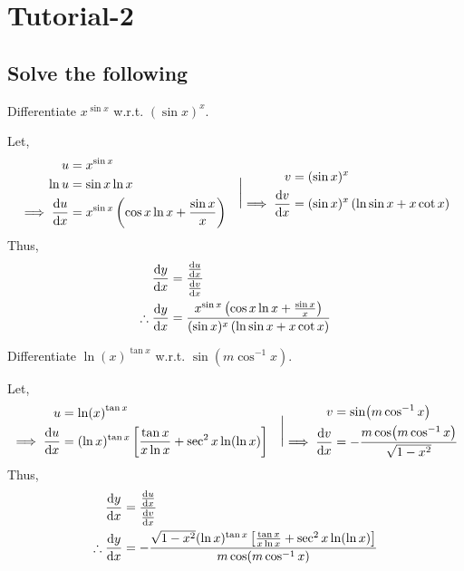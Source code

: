 \section{Tutorial-2}
\subsection{Solve the following}
\begin{asign}
	Differentiate $x^{\sin x}$ w.r.t. $(\sin x)^x$.
\end{asign}
\begin{anse}
	Let,
	\[\begin{split}
		u&=x^{\sin x}\\
		\ln u&=\sin x \ln x\\
		\implies \dv{u}{x}&=x^{\sin x}\left(\cos x\ln x+\frac{\sin x}{x}\right)
	\end{split}
	\quad \bigg\vert
	\begin{split}
		v&=(\sin x)^x\\
		\implies \dv{v}{x}&=(\sin x)^x\left(\ln\sin x+x\cot x\right)
	\end{split}
	\]
	Thus,
	\[\begin{split}
		\dv{y}{x}&=\frac{\dv{u}{x}}{\dv{v}{x}}\\
		\therefore \dv{y}{x}&=\frac{x^{\sin x}\left(\cos x\ln x+\frac{\sin x}{x}\right)}{(\sin x)^x\left(\ln\sin x+x\cot x\right)}
	\end{split}\]
\end{anse}
\begin{asign}
	Differentiate $\ln(x)^{\tan x}$ w.r.t. $\sin(m\cos^{-1}x)$.
\end{asign}
\begin{anse}
	Let,
	\[\begin{split}
		u&=\ln(x)^{\tan x}\\
		\implies \dv{u}{x}&=(\ln x)^{\tan x}\left[\frac{\tan x}{x\ln x}+\sec^2x\ln(\ln x)\right]
	\end{split}
	\quad \bigg\vert
	\begin{split}
		v&=\sin(m\cos^{-1}x)\\
		\implies \dv{v}{x}&=-\frac{m\cos(m\cos^{-1}x)}{\sqrt{1-x^2}}
	\end{split}\]
	Thus,
	\[\begin{split}
		\dv{y}{x}&=\frac{\dv{u}{x}}{\dv{v}{x}}\\
		\therefore \dv{y}{x}&=-\frac{\sqrt{1-x^2}(\ln x)^{\tan x}\left[\frac{\tan x}{x\ln x}+\sec^2x\ln(\ln x)\right]}{m\cos(m\cos^{-1}x)}
	\end{split}\]
\end{anse}
